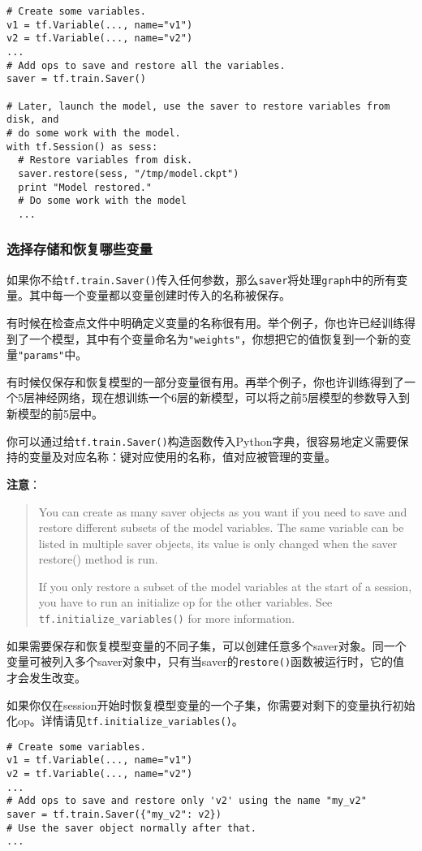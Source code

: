 \begin{lstlisting}
# Create some variables.
v1 = tf.Variable(..., name="v1")
v2 = tf.Variable(..., name="v2")
...
# Add ops to save and restore all the variables.
saver = tf.train.Saver()

# Later, launch the model, use the saver to restore variables from disk, and
# do some work with the model.
with tf.Session() as sess:
  # Restore variables from disk.
  saver.restore(sess, "/tmp/model.ckpt")
  print "Model restored."
  # Do some work with the model
  ...
\end{lstlisting}

\subsubsection{选择存储和恢复哪些变量}
如果你不给\lstinline{tf.train.Saver()}传入任何参数，那么\lstinline{saver}将处理\lstinline{graph}中的所有变量。其中每一个变量都以变量创建时传入的名称被保存。

有时候在检查点文件中明确定义变量的名称很有用。举个例子，你也许已经训练得到了一个模型，其中有个变量命名为\lstinline{"weights"}，你想把它的值恢复到一个新的变量\lstinline{"params"}中。

有时候仅保存和恢复模型的一部分变量很有用。再举个例子，你也许训练得到了一个5层神经网络，现在想训练一个6层的新模型，可以将之前5层模型的参数导入到新模型的前5层中。

你可以通过给\lstinline{tf.train.Saver()}构造函数传入Python字典，很容易地定义需要保持的变量及对应名称：键对应使用的名称，值对应被管理的变量。

\textbf{注意}：

\begin{quote}
You can create as many saver objects as you want if you need to save and restore different subsets of the model variables. The same variable can be listed in multiple saver objects, its value is only changed when the saver restore() method is run.

If you only restore a subset of the model variables at the start of a session, you have to run an initialize op for the other variables. See \lstinline{tf.initialize_variables()} for more information.
\end{quote}

如果需要保存和恢复模型变量的不同子集，可以创建任意多个saver对象。同一个变量可被列入多个saver对象中，只有当saver的\lstinline{restore()}函数被运行时，它的值才会发生改变。

如果你仅在session开始时恢复模型变量的一个子集，你需要对剩下的变量执行初始化op。详情请见\lstinline{tf.initialize_variables()}。


\begin{lstlisting}
# Create some variables.
v1 = tf.Variable(..., name="v1")
v2 = tf.Variable(..., name="v2")
...
# Add ops to save and restore only 'v2' using the name "my_v2"
saver = tf.train.Saver({"my_v2": v2})
# Use the saver object normally after that.
...
\end{lstlisting}